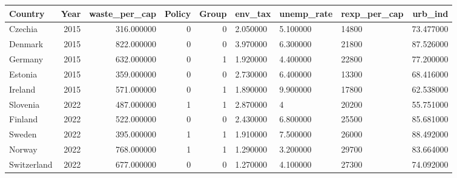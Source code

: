 \begin{tabular}{lrrrrlllr}
\toprule
Country & Year & waste_per_cap & Policy & Group & env_tax & unemp_rate & rexp_per_cap & urb_ind \\
\midrule
Czechia & 2015 & 316.000000 & 0 & 0 & 2.050000 & 5.100000 & 14800 & 73.477000 \\
Denmark & 2015 & 822.000000 & 0 & 0 & 3.970000 & 6.300000 & 21800 & 87.526000 \\
Germany & 2015 & 632.000000 & 0 & 1 & 1.920000 & 4.400000 & 22800 & 77.200000 \\
Estonia & 2015 & 359.000000 & 0 & 0 & 2.730000 & 6.400000 & 13300 & 68.416000 \\
Ireland & 2015 & 571.000000 & 0 & 1 & 1.890000 & 9.900000 & 17800 & 62.538000 \\
Slovenia & 2022 & 487.000000 & 1 & 1 & 2.870000 & 4 & 20200 & 55.751000 \\
Finland & 2022 & 522.000000 & 0 & 0 & 2.430000 & 6.800000 & 25500 & 85.681000 \\
Sweden & 2022 & 395.000000 & 1 & 1 & 1.910000 & 7.500000 & 26000 & 88.492000 \\
Norway & 2022 & 768.000000 & 1 & 1 & 1.290000 & 3.200000 & 29700 & 83.664000 \\
Switzerland & 2022 & 677.000000 & 0 & 0 & 1.270000 & 4.100000 & 27300 & 74.092000 \\
\bottomrule
\end{tabular}
